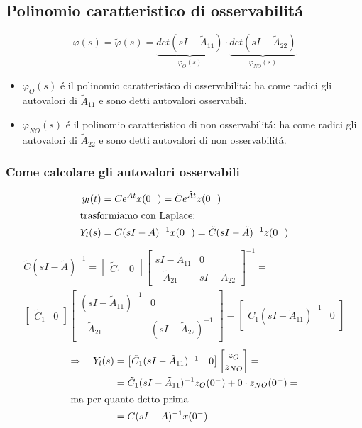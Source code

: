 \documentclass[../main.tex]{subfiles}
\begin{document}
	\subsection{Polinomio caratteristico di osservabilit\'a}
		\[
			\varphi(s) = \tilde{\varphi}(s) = \underbrace{det(sI- \tilde A_{11})}_{\varphi_O(s)} \cdot \underbrace{det(sI- \tilde A_{22})}_{\varphi_{NO}(s)}
		\]
		\begin{itemize}
			\item 
				$ \varphi_O(s) $ \'e il polinomio caratteristico di osservabilit\'a: ha come radici gli autovalori di $ \tilde A_{11} $ e sono detti autovalori osservabili.
			\item 
				$ \varphi_{NO}(s) $ \'e il polinomio caratteristico di non osservabilit\'a: ha come radici gli autovalori di $ \tilde A_{22} $ e sono detti autovalori di non osservabilit\'a.
		\end{itemize}
	
	\subsubsection{Come calcolare gli autovalori osservabili}
		\begin{align*}
			y_l(t) &= C e^{At} x(0^{-}) = \tilde C e^{\tilde At} z(0^{-})\\
			\intertext{trasformiamo con Laplace:}
			Y_l(s) &= C(sI-A)^{-1}x(0^{-}) = \tilde C (sI-\tilde A)^{-1} z(0^{-})
		\end{align*}
		\begin{align*}
			\tilde C (sI-\tilde A)^{-1} =
			\begin{bmatrix}
				\tilde C_1 & 0
			\end{bmatrix}
			\begin{bmatrix}
				sI-\tilde A_{11} & 0\\
				-\tilde A_{21} & sI-\tilde A_{22}
			\end{bmatrix}^{-1} =
			\\
			\begin{bmatrix}
				\tilde C_1 & 0
			\end{bmatrix}
			\begin{bmatrix}
				(sI-\tilde A_{11})^{-1} & 0\\
				-\tilde A_{21} & (sI-\tilde A_{22})^{-1}
			\end{bmatrix} =
			\begin{bmatrix}
				\tilde C_1 (sI- \tilde A_{11})^{-1} & 0
			\end{bmatrix}
		\end{align*}
		\begin{align*}
			\Rightarrow\quad Y_l(s) &=
			\begin{bmatrix}
				\tilde C_1(sI-\tilde A_{11})^{-1} & 0
			\end{bmatrix}
			\begin{bmatrix}
				z_O\\
				z_{NO}
			\end{bmatrix} =
			\\
			&= \tilde C_1 (sI-\tilde A_{11})^{-1} z_O(0^{-}) + 0 \cdot z_{NO}(0^{-}) =
			\\
			\intertext{ma per quanto detto prima}
			&= C(sI-A)^{-1} x(0^{-})
		\end{align*}
		
\end{document}
